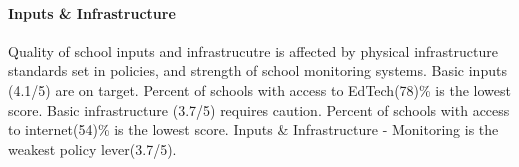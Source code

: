\documentclass[
  twocolumn]{article}
\begin{document}
\hypertarget{inputs-infrastructure}{%
\paragraph{\texorpdfstring{\textbf{Inputs \&
Infrastructure}}{Inputs \& Infrastructure}}\label{inputs-infrastructure}}

Quality of school inputs and infrastrucutre is affected by physical
infrastructure standards set in policies, and strength of school
monitoring systems. Basic inputs (4.1/5) are on target. Percent of
schools with access to EdTech(78)\% is the lowest score. Basic
infrastructure (3.7/5) requires caution. Percent of schools with access
to internet(54)\% is the lowest score. Inputs \& Infrastructure -
Monitoring is the weakest policy lever(3.7/5).

\begin{table}[H]
\end{table}
\end{document}
